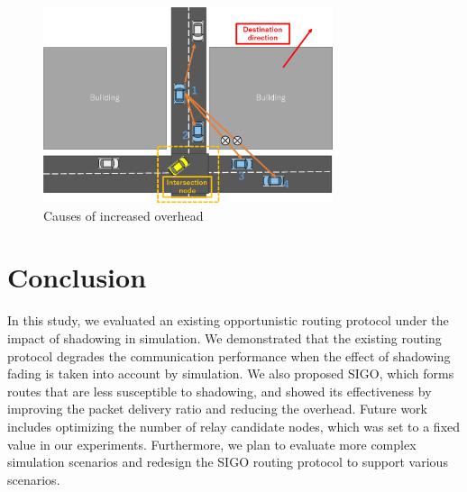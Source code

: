 \documentclass[conference]{IEEEtran}
\begin{document}
\begin{figure}[!ht]
\centering
\includegraphics[width=85mm]{figures/overhead_reason.eps}
\caption{Causes of increased overhead}
\label{fig:overhead_reason}
\end{figure}



\section{Conclusion}
\label{conclusion}
In this study, we evaluated an existing opportunistic routing protocol under the impact of shadowing in simulation. We demonstrated that the existing routing protocol degrades the communication performance when the effect of shadowing fading is taken into account by simulation. 
We also proposed SIGO, which forms routes that are less susceptible to shadowing, and showed its effectiveness by improving the packet delivery ratio and reducing the overhead. 
Future work includes optimizing the number of relay candidate nodes, which was set to a fixed value in  our experiments. Furthermore, we plan to evaluate more complex simulation scenarios and redesign the SIGO routing protocol to support  various scenarios.



\end{document}
